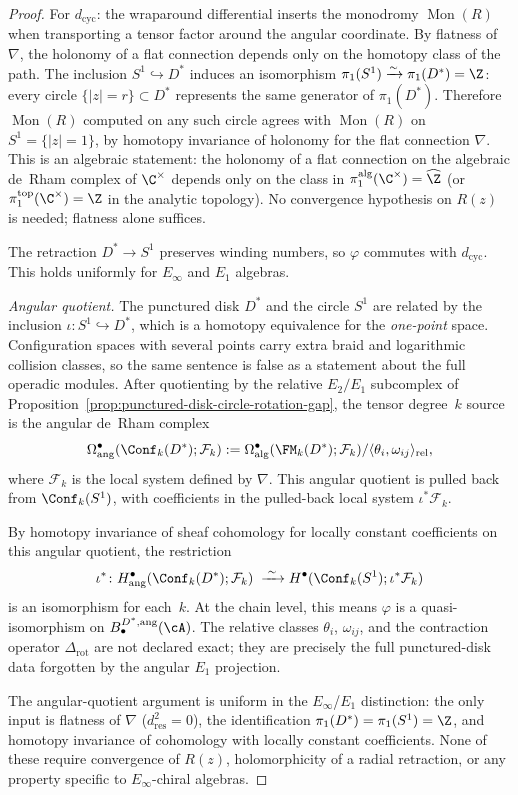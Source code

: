 \begin{proof}
For $d_{\mathrm{cyc}}$: the wraparound differential inserts
the monodromy $\operatorname{Mon}(R)$ when transporting a tensor
factor around the angular coordinate. By flatness of $\nabla$,
the holonomy of a flat connection depends only on the homotopy
class of the path. The inclusion $S^1\hookrightarrow D^*$ induces
an isomorphism $\pi_1(S^1)\xrightarrow{\sim}\pi_1(D^*)=\Z$: every
circle $\{|z|=r\}\subset D^*$ represents the same generator of
$\pi_1(D^*)$. Therefore $\operatorname{Mon}(R)$ computed on any
such circle agrees with $\operatorname{Mon}(R)$ on $S^1=\{|z|=1\}$,
by homotopy invariance of holonomy for the flat connection $\nabla$.
This is an algebraic statement: the holonomy of a flat connection
on the algebraic de~Rham complex of $\C^\times$ depends only on
the class in $\pi_1^{\mathrm{alg}}(\C^\times)=\widehat{\Z}$
(or $\pi_1^{\mathrm{top}}(\C^\times)=\Z$ in the analytic
topology). No convergence hypothesis on $R(z)$ is needed;
flatness alone suffices.

The retraction $D^*\to S^1$ preserves winding numbers, so
$\varphi$ commutes with $d_{\mathrm{cyc}}$. This holds
uniformly for $E_\infty$ and $E_1$ algebras.

\emph{Angular quotient.}
The punctured disk $D^*$ and the circle $S^1$ are related by the
inclusion $\iota\colon S^1\hookrightarrow D^*$, which is a homotopy
equivalence for the \emph{one-point} space. Configuration spaces with
several points carry extra braid and logarithmic collision classes, so
the same sentence is false as a statement about the full operadic
modules. After quotienting by the relative \(E_2/E_1\) subcomplex of
Proposition~\ref{prop:punctured-disk-circle-rotation-gap}, the tensor
degree~\(k\) source is the angular de~Rham complex
\[
\Omega^\bullet_{\mathrm{ang}}(\Conf_k(D^*);\mathcal F_k)
:=
\Omega^\bullet_{\mathrm{alg}}(\FM_k(D^*);\mathcal F_k)/
\langle\theta_i,\omega_{ij}\rangle_{\mathrm{rel}},
\]
where \(\mathcal F_k\) is the local system defined by \(\nabla\). This
angular quotient is pulled back from
\(\Conf_k(S^1)\), with coefficients in the pulled-back local system
\(\iota^*\mathcal F_k\).

By homotopy invariance of sheaf cohomology for locally constant
coefficients on this angular quotient, the restriction
\[
\iota^*\colon
H^\bullet_{\mathrm{ang}}(\Conf_k(D^*);\mathcal{F}_k)
\;\xrightarrow{\;\sim\;}
H^\bullet(\Conf_k(S^1);\iota^*\mathcal{F}_k)
\]
is an isomorphism for each~$k$. At the chain level, this means
\(\varphi\) is a quasi-isomorphism on
\(B^{D^*,\mathrm{ang}}_\bullet(\cA)\). The relative classes
\(\theta_i\), \(\omega_{ij}\), and the contraction operator
\(\Delta_{\mathrm{rot}}\) are not declared exact; they are precisely
the full punctured-disk data forgotten by the angular \(E_1\)
projection.

The angular-quotient argument is uniform in the $E_\infty$/$E_1$ distinction:
the only input is flatness of $\nabla$
($d_{\mathrm{res}}^2=0$), the identification
$\pi_1(D^*)=\pi_1(S^1)=\Z$, and homotopy invariance
of cohomology with locally constant coefficients. None of
these require convergence of $R(z)$, holomorphicity of a
radial retraction, or any property specific to
$E_\infty$-chiral algebras.
\end{proof}

